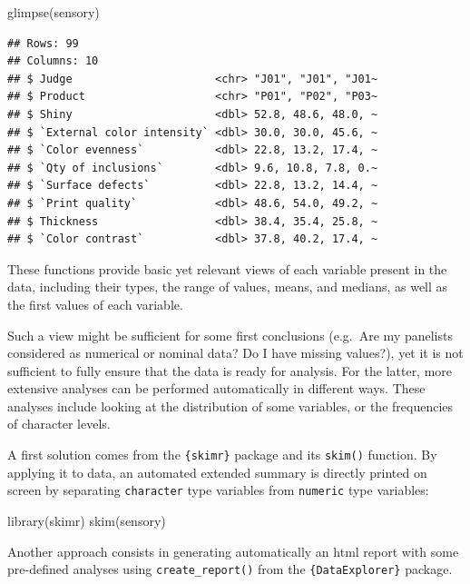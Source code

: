 \documentclass[
]{krantz}
\makeatletter
\newenvironment{Shaded}{\begin{snugshade}}{\end{snugshade}}
\newcommand{\FunctionTok}[1]{\textcolor[rgb]{0,0,0}{#1}}
\newcommand{\NormalTok}[1]{#1}
\newenvironment{kframe}{%
\medskip{}
\setlength{\fboxsep}{.8em}
 \def\at@end@of@kframe{}%
 \ifinner\ifhmode%
  \def\at@end@of@kframe{\end{minipage}}%
  \begin{minipage}{\columnwidth}%
 \fi\fi%
 \def\FrameCommand##1{\hskip\@totalleftmargin \hskip-\fboxsep
 \colorbox{shadecolor}{##1}\hskip-\fboxsep
     \hskip-\linewidth \hskip-\@totalleftmargin \hskip\columnwidth}%
 \MakeFramed {\advance\hsize-\width
   \@totalleftmargin\z@ \linewidth\hsize
   \@setminipage}}%
 {\par\unskip\endMakeFramed%
 \at@end@of@kframe}
\renewenvironment{Shaded}{\begin{kframe}}{\end{kframe}}
\makeatother
\begin{document}
\begin{Shaded}
\begin{Highlighting}[]
\FunctionTok{glimpse}\NormalTok{(sensory)}
\end{Highlighting}
\end{Shaded}

\begin{verbatim}
## Rows: 99
## Columns: 10
## $ Judge                      <chr> "J01", "J01", "J01~
## $ Product                    <chr> "P01", "P02", "P03~
## $ Shiny                      <dbl> 52.8, 48.6, 48.0, ~
## $ `External color intensity` <dbl> 30.0, 30.0, 45.6, ~
## $ `Color evenness`           <dbl> 22.8, 13.2, 17.4, ~
## $ `Qty of inclusions`        <dbl> 9.6, 10.8, 7.8, 0.~
## $ `Surface defects`          <dbl> 22.8, 13.2, 14.4, ~
## $ `Print quality`            <dbl> 48.6, 54.0, 49.2, ~
## $ Thickness                  <dbl> 38.4, 35.4, 25.8, ~
## $ `Color contrast`           <dbl> 37.8, 40.2, 17.4, ~
\end{verbatim}

These functions provide basic yet relevant views of each variable present in the data, including their types, the range of values, means, and medians, as well as the first values of each variable.

Such a view might be sufficient for some first conclusions (e.g.~Are my panelists considered as numerical or nominal data? Do I have missing values?), yet it is not sufficient to fully ensure that the data is ready for analysis. For the latter, more extensive analyses can be performed automatically in different ways. These analyses include looking at the distribution of some variables, or the frequencies of character levels.

A first solution comes from the \texttt{\{skimr\}} package and its \texttt{skim()} function. By applying it to data, an automated extended summary is directly printed on screen by separating \texttt{character} type variables from \texttt{numeric} type variables:

\begin{Shaded}
\begin{Highlighting}[]
\FunctionTok{library}\NormalTok{(skimr)}
\FunctionTok{skim}\NormalTok{(sensory)}
\end{Highlighting}
\end{Shaded}

Another approach consists in generating automatically an html report with some pre-defined analyses using \texttt{create\_report()} from the \texttt{\{DataExplorer\}} package.
\end{document}

